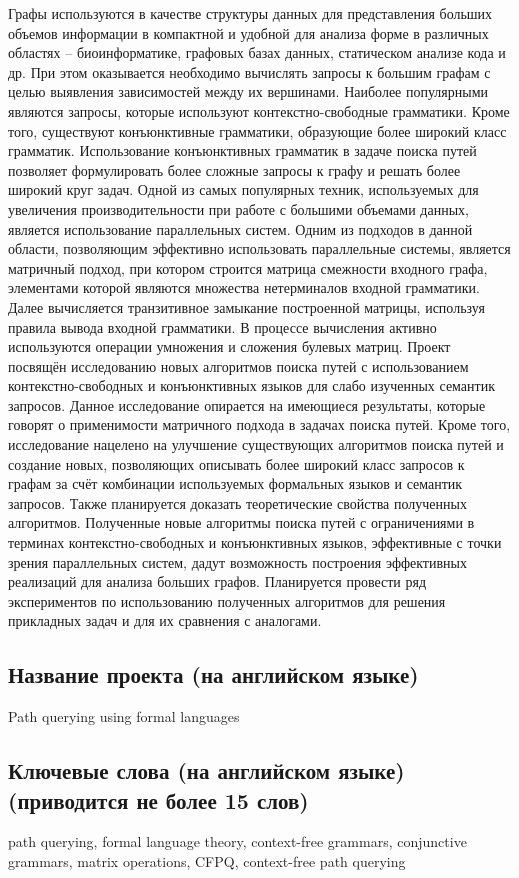 \documentclass[12pt]{article}  %
\theoremstyle{remark}
\begin{document}
Графы используются в качестве структуры данных для представления больших объемов информации в компактной и удобной для анализа форме в различных областях – биоинформатике, графовых базах данных, статическом анализе кода и др. При этом оказывается необходимо вычислять запросы к большим графам с целью выявления зависимостей между их вершинами. Наиболее популярными являются запросы, которые используют контекстно-свободные грамматики. Кроме того, существуют конъюнктивные грамматики, образующие более широкий класс грамматик. Использование конъюнктивных грамматик в задаче поиска путей позволяет формулировать более сложные запросы к графу и решать более широкий круг задач. Одной из самых популярных техник, используемых для увеличения производительности при работе с большими объемами данных, является использование параллельных систем. Одним из подходов в данной области, позволяющим эффективно использовать параллельные системы, является матричный подход, при котором строится матрица смежности входного графа, элементами которой являются множества нетерминалов входной грамматики. Далее вычисляется транзитивное замыкание построенной матрицы, используя правила вывода входной грамматики. В процессе вычисления активно используются операции умножения и сложения булевых матриц. Проект посвящён исследованию новых алгоритмов поиска путей с использованием контекстно-свободных и конъюнктивных языков для слабо изученных семантик запросов. Данное исследование опирается на имеющиеся результаты, которые говорят о применимости матричного подхода в задачах поиска путей. Кроме того, исследование нацелено на улучшение существующих алгоритмов поиска путей и создание новых, позволяющих описывать более широкий класс запросов к графам за счёт комбинации используемых формальных языков и семантик запросов. Также планируется доказать теоретические свойства полученных алгоритмов. Полученные новые алгоритмы поиска путей с ограничениями в терминах контекстно-свободных и конъюнктивных языков, эффективные с точки зрения параллельных систем, дадут возможность построения эффективных реализаций для анализа больших графов. Планируется провести ряд экспериментов по использованию полученных алгоритмов для решения прикладных задач и для их сравнения с аналогами.


\subsection{Название проекта (на английском языке)}
Path querying using formal languages

\subsection{Ключевые слова (на английском языке)(приводится не более 15 слов)}
path querying, formal language theory, context-free grammars, conjunctive grammars, matrix operations, CFPQ, context-free path querying
\end{document}

